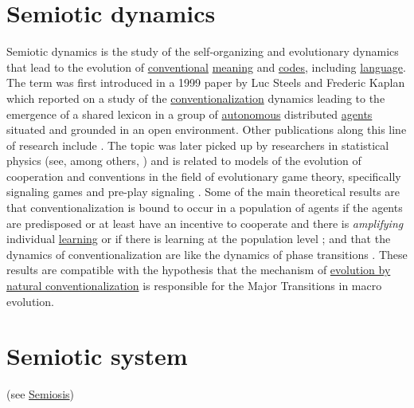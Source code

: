 \documentclass[12pt]{article}
\begin{document}
\section{Semiotic dynamics}

Semiotic dynamics is the study of the self-organizing and evolutionary
dynamics that lead to the evolution of
\hyperlink{convention}{conventional} \hyperlink{meaning}{meaning} and \hyperlink{code}{codes}, including
\hyperlink{language}{language}. The term was first introduced in a
1999 paper by Luc Steels and Frederic Kaplan \cite{steels99ecal} which
reported on a study of the
\hyperlink{conventionalization}{conventionalization} dynamics leading
to the emergence of a shared lexicon in a group of \hyperlink{autonomy}{autonomous}
distributed \hyperlink{agent}{agents} situated and grounded in an open environment. Other
publications along this line of research include
\cite{DeBeule06Cross_Situational_learning,vylder06namingGameConvergenceJTB,devylder07:phd,wellens08:_flexib_word_meanin_in_embod_agent}. The
topic was later picked up by researchers in statistical physics (see,
among others,
\cite{baronchelli05sharpTransitionVocabulary,cattuto07:_semiot_dynam_and_collab_taggin,puglisi08culturalRoutePNAS,loreto12})
and is related to models of the evolution of cooperation and
conventions in the field of evolutionary game theory, specifically
signaling games and pre-play signaling
\cite{skyrms10:_signal_evolut_learn_infor,santos11:_co}. Some of the
main theoretical results are that conventionalization is bound to
occur in a population of agents if the agents are predisposed or at
least have an incentive to cooperate and there is {\em amplifying}
individual \hyperlink{learning}{learning}
\cite{vylder06namingGameConvergenceJTB,skyrms10:_signal_evolut_learn_infor}
or if there is learning at the population level
\cite{santos11:_co,beule12:_overc_traged_commun_hawk_dove_conven_codin};
and that the dynamics of conventionalization are like the dynamics of
phase transitions \cite{baronchelli05sharpTransitionVocabulary}. These
results are compatible with the hypothesis that the mechanism of
\hyperlink{natural_conventionalization}{ evolution by natural
  conventionalization} is responsible for the Major Transitions in macro evolution.


\hypertarget{semiotic_system}{}
\section{Semiotic system} (see \hyperlink{semiosis}{Semiosis})
\end{document}
